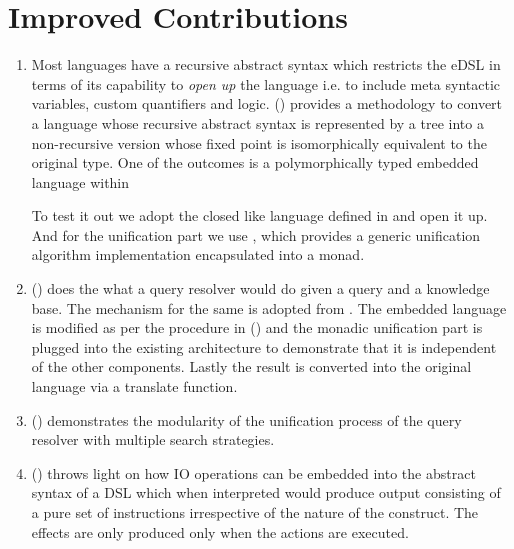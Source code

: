 \documentclass[thesis-solanki.tex]{subfiles}
\begin{document}
\section{Improved Contributions}
\begin{enumerate}
\item
  Most languages have a recursive abstract syntax which restricts the eDSL in terms of its capability to
  \textit{open up} the language\yyy{}{\large,} i.e.\yyy{}{\large,}
  to include meta syntactic variables,  custom quantifiers and logic.
  () provides a methodology to convert a language whose recursive abstract
  syntax is represented by a tree into a non-recursive version whose fixed point is isomorphically equivalent to
  the original type.
  One of the outcomes is a polymorphically typed embedded language within 

  To test it out we adopt the closed  like language defined in \cite{prolog-lib} and open it up.
  And for the unification part we use \cite{unification-fd-lib}, which provides a generic unification algorithm
  implementation encapsulated into a monad.

\item
  () does the what a  query resolver would do given a
  query and a knowledge base.
  The mechanism for the same is adopted from \cite{prolog-lib}.
  The embedded language is modified as per the procedure in () and the
  monadic unification part is plugged into the existing architecture to demonstrate that it is independent of the
  other components.
  Lastly the result is converted into the original language via a translate function.

\item
  () demonstrates the modularity of the unification process of the query
  resolver with multiple search strategies.

\item
  () throws light on how IO operations can be embedded into the abstract
  syntax of a DSL which when interpreted would produce output consisting of a pure set of instructions irrespective
  of the nature of the construct.
  The effects are only produced only when the actions are executed.
\end{enumerate}
\end{document}
